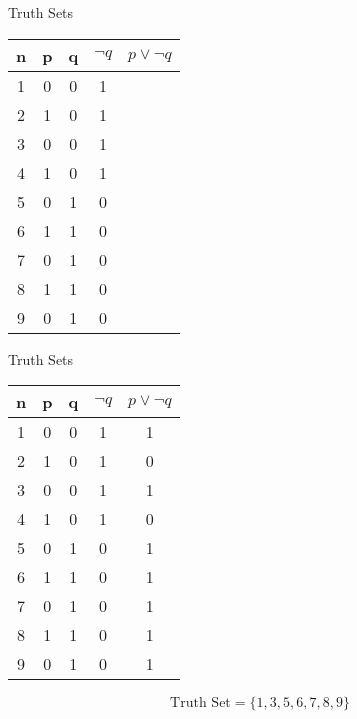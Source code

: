 \documentclass{beamer}
\begin{document}
\begin{frame}
{Truth Sets}

\begin{center}
\begin{tabular}{|c||c|c||c||c|}
\hline \phantom{sp} n \phantom{sp} & \phantom{sp} p \phantom{sp} & \phantom{sp}q \phantom{sp}& \phantom{s} $\neg q$ \phantom{s}& \phantom{s} $p \vee \neg q$ \phantom{s}\\  \hline
\hline 1 & 0 & 0 & 1 & \\ 
\hline 2 & 1 & 0 & 1 & \\ 
\hline 3 & 0 & 0 & 1 & \\ 
\hline 4 & 1 & 0 & 1 & \\ 
\hline 5 & 0 & 1 & 0 & \\ 
\hline 6 & 1 & 1 & 0 & \\ 
\hline 7 & 0 & 1 & 0 & \\ 
\hline 8 & 1 & 1 & 0 & \\ 
\hline 9 & 0 & 1 & 0 & \\ 
\hline 
\end{tabular}
\end{center} 
\end{frame}
\begin{frame}
{Truth Sets}

\begin{center}
\begin{tabular}{|c||c|c||c||c|}
\hline \phantom{sp} n \phantom{sp} & \phantom{sp} p \phantom{sp} & \phantom{sp}q \phantom{sp}& \phantom{s} $\neg q$ \phantom{s}& \phantom{s} $p \vee \neg q$ \phantom{s}\\  \hline
\hline 1 & 0 & 0 & 1 & 1\\ 
\hline 2 & 1 & 0 & 1 & 0\\ 
\hline 3 & 0 & 0 & 1 & 1\\ 
\hline 4 & 1 & 0 & 1 & 0\\ 
\hline 5 & 0 & 1 & 0 & 1\\ 
\hline 6 & 1 & 1 & 0 & 1\\ 
\hline 7 & 0 & 1 & 0 & 1\\ 
\hline 8 & 1 & 1 & 0 & 1\\ 
\hline 9 & 0 & 1 & 0 & 1\\ 
\hline 
\end{tabular}
\end{center} 
\[\mbox{Truth Set} = \{1,3,5,6,7,8,9\}\]
\end{frame}
\end{document}
